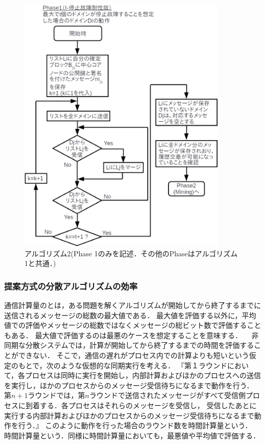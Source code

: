 \documentclass[a4paper,12pt]{jsarticle}
\begin{document}
%
%
\begin{figure}[H]%
  \begin{center}
    \includegraphics[width=100mm]{pht/flow_chart-algorithm2.eps}
  \end{center}
  \caption{アルゴリズム2(Phase 1のみを記述．その他のPhaseはアルゴリズム1と共通．)}
  \label{fig:algorithm2}
\end{figure}
%
      \subsubsection{提案方式の分散アルゴリズムの効率}%
通信計算量のとは，ある問題を解くアルゴリズムが開始してから終了するまでに送信されるメッセージの総数の最大値である．
最大値を評価する以外に，平均値での評価やメッセージの総数ではなくメッセージの総ビット数で評価することもある．
最大値で評価するのは最悪のケースを想定することを意味する．
　非同期な分散システムでは，計算が開始してから終了するまでの時間を評価することができない．
そこで，通信の遅れがプロセス内での計算よりも短いという仮定のもとで，次のような仮想的な同期実行を考える．
『第１ラウンドにおいて，各プロセスは同時に実行を開始し，内部計算およびほかのプロセスへの送信を実行し，ほかのプロセスからのメッセージ受信待ちになるまで動作を行う．
第$n + 1$ラウンドでは，第$n$ラウンドで送信されたメッセージがすべて受信側プロセスに到着する．各プロセスはそれらのメッセージを受信し，
受信したあとに実行する内部計算およびほかのプロセスからのメッセージ受信待ちになるまで動作を行う．』
このように動作を行った場合のラウンド数を時間計算量という．
時間計算量という．同様に時間計算量においても，最悪値や平均値で評価する．
\end{document}
